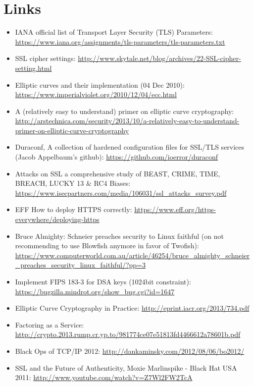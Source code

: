 \section{Links}
\label{section:Links}


\begin{itemize}
\item IANA official list of Transport Layer Security (TLS) Parameters: \url{https://www.iana.org/assignments/tls-parameters/tls-parameters.txt}
\item SSL cipher settings: \url{http://www.skytale.net/blog/archives/22-SSL-cipher-setting.html}
\item Elliptic curves and their implementation (04 Dec 2010): \url{https://www.imperialviolet.org/2010/12/04/ecc.html}
\item A (relatively easy to understand) primer on elliptic curve cryptography: \url{http://arstechnica.com/security/2013/10/a-relatively-easy-to-understand-primer-on-elliptic-curve-cryptography}
\item Duraconf, A collection of hardened configuration files for SSL/TLS services (Jacob Appelbaum's github): \url{https://github.com/ioerror/duraconf}
\item Attacks on SSL a comprehensive study of BEAST, CRIME, TIME, BREACH, LUCKY 13 \& RC4 Biases: \url{https://www.isecpartners.com/media/106031/ssl_attacks_survey.pdf}
\item EFF How to deploy HTTPS correctly: \url{https://www.eff.org/https-everywhere/deploying-https}
\item Bruce Almighty: Schneier preaches security to Linux faithful (on not recommending to use Blowfish anymore in favor of Twofish): \url{https://www.computerworld.com.au/article/46254/bruce_almighty_schneier_preaches_security_linux_faithful/?pp=3}
\item Implement FIPS 183-3 for DSA keys (1024bit constraint): \url{https://bugzilla.mindrot.org/show_bug.cgi?id=1647}
\item Elliptic Curve Cryptography in Practice: \url{http://eprint.iacr.org/2013/734.pdf}
\item Factoring as a Service: \url{http://crypto.2013.rump.cr.yp.to/981774ce07e51813fd4466612a78601b.pdf}
\item Black Ops of TCP/IP 2012: \url{http://dankaminsky.com/2012/08/06/bo2012/}
\item SSL and the Future of Authenticity, Moxie Marlinspike - Black Hat USA 2011: \url{http://www.youtube.com/watch?v=Z7Wl2FW2TcA}

\end{itemize}
